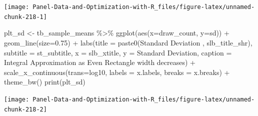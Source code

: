\documentclass[
]{book}
\newenvironment{Shaded}{\begin{snugshade}}{\end{snugshade}}
\newcommand{\AttributeTok}[1]{\textcolor[rgb]{0.77,0.63,0.00}{#1}}
\newcommand{\FloatTok}[1]{\textcolor[rgb]{0.00,0.00,0.81}{#1}}
\newcommand{\FunctionTok}[1]{\textcolor[rgb]{0.00,0.00,0.00}{#1}}
\newcommand{\NormalTok}[1]{#1}
\newcommand{\OtherTok}[1]{\textcolor[rgb]{0.56,0.35,0.01}{#1}}
\newcommand{\SpecialCharTok}[1]{\textcolor[rgb]{0.00,0.00,0.00}{#1}}
\newcommand{\StringTok}[1]{\textcolor[rgb]{0.31,0.60,0.02}{#1}}
\begin{document}
\begin{center}\texttt{[image: Panel-Data-and-Optimization-with-R\_files/figure-latex/unnamed-chunk-218-1]} \end{center}

\begin{Shaded}
\begin{Highlighting}[]
\NormalTok{plt\_sd }\OtherTok{\textless{}{-}}\NormalTok{ tb\_sample\_means }\SpecialCharTok{\%\textgreater{}\%}
  \FunctionTok{ggplot}\NormalTok{(}\FunctionTok{aes}\NormalTok{(}\AttributeTok{x=}\NormalTok{draw\_count, }\AttributeTok{y=}\NormalTok{sd)) }\SpecialCharTok{+}
  \FunctionTok{geom\_line}\NormalTok{(}\AttributeTok{size=}\FloatTok{0.75}\NormalTok{) }\SpecialCharTok{+}
  \FunctionTok{labs}\NormalTok{(}\AttributeTok{title =} \FunctionTok{paste0}\NormalTok{(}\StringTok{\textquotesingle{}Standard Deviation \textquotesingle{}}\NormalTok{, slb\_title\_shr),}
       \AttributeTok{subtitle =}\NormalTok{ st\_subtitle,}
       \AttributeTok{x =}\NormalTok{ slb\_xtitle,}
       \AttributeTok{y =} \StringTok{\textquotesingle{}Standard Deviation\textquotesingle{}}\NormalTok{,}
       \AttributeTok{caption =} \StringTok{\textquotesingle{}Integral Approximation as Even Rectangle width decreases\textquotesingle{}}\NormalTok{) }\SpecialCharTok{+}
  \FunctionTok{scale\_x\_continuous}\NormalTok{(}\AttributeTok{trans=}\StringTok{\textquotesingle{}log10\textquotesingle{}}\NormalTok{, }\AttributeTok{labels =}\NormalTok{ x.labels, }\AttributeTok{breaks =}\NormalTok{ x.breaks) }\SpecialCharTok{+}
  \FunctionTok{theme\_bw}\NormalTok{()}
\FunctionTok{print}\NormalTok{(plt\_sd)}
\end{Highlighting}
\end{Shaded}

\begin{center}\texttt{[image: Panel-Data-and-Optimization-with-R\_files/figure-latex/unnamed-chunk-218-2]} \end{center}
\end{document}
